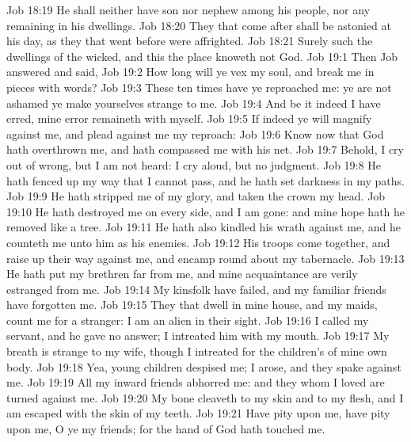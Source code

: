 \vs Job 18:19 He shall neither have son nor nephew among his people, nor any remaining in his dwellings.
\vs Job 18:20 They that come after  shall be astonied at his day, as they that went before were affrighted.
\vs Job 18:21 Surely such  the dwellings of the wicked, and this  the place  knoweth not God.
\vs Job 19:1 Then Job answered and said,
\vs Job 19:2 How long will ye vex my soul, and break me in pieces with words?
\vs Job 19:3 These ten times have ye reproached me: ye are not ashamed  ye make yourselves strange to me.
\vs Job 19:4 And be it indeed  I have erred, mine error remaineth with myself.
\vs Job 19:5 If indeed ye will magnify  against me, and plead against me my reproach:
\vs Job 19:6 Know now that God hath overthrown me, and hath compassed me with his net.
\vs Job 19:7 Behold, I cry out of wrong, but I am not heard: I cry aloud, but  no judgment.
\vs Job 19:8 He hath fenced up my way that I cannot pass, and he hath set darkness in my paths.
\vs Job 19:9 He hath stripped me of my glory, and taken the crown  my head.
\vs Job 19:10 He hath destroyed me on every side, and I am gone: and mine hope hath he removed like a tree.
\vs Job 19:11 He hath also kindled his wrath against me, and he counteth me unto him as  his enemies.
\vs Job 19:12 His troops come together, and raise up their way against me, and encamp round about my tabernacle.
\vs Job 19:13 He hath put my brethren far from me, and mine acquaintance are verily estranged from me.
\vs Job 19:14 My kinsfolk have failed, and my familiar friends have forgotten me.
\vs Job 19:15 They that dwell in mine house, and my maids, count me for a stranger: I am an alien in their sight.
\vs Job 19:16 I called my servant, and he gave  no answer; I intreated him with my mouth.
\vs Job 19:17 My breath is strange to my wife, though I intreated for the children's  of mine own body.
\vs Job 19:18 Yea, young children despised me; I arose, and they spake against me.
\vs Job 19:19 All my inward friends abhorred me: and they whom I loved are turned against me.
\vs Job 19:20 My bone cleaveth to my skin and to my flesh, and I am escaped with the skin of my teeth.
\vs Job 19:21 Have pity upon me, have pity upon me, O ye my friends; for the hand of God hath touched me.
